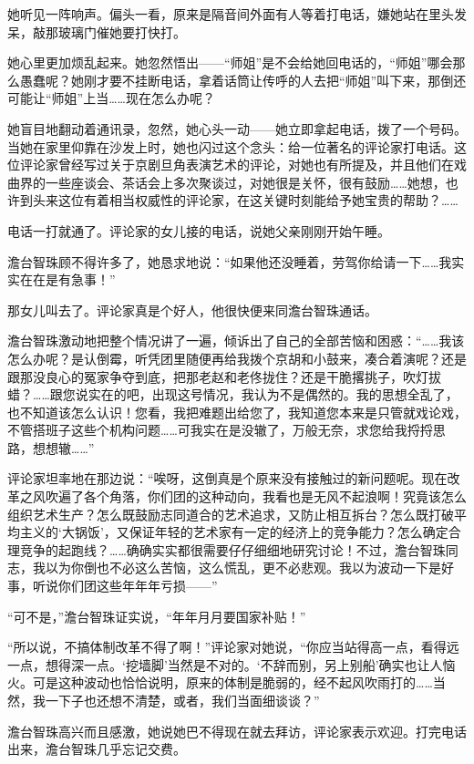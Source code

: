 \par 她听见一阵响声。偏头一看，原来是隔音间外面有人等着打电话，嫌她站在里头发呆，敲那玻璃门催她要打快打。
\par 她心里更加烦乱起来。她忽然悟出——“师姐”是不会给她回电话的，“师姐”哪会那么愚蠢呢？她刚才要不挂断电话，拿着话筒让传呼的人去把“师姐”叫下来，那倒还可能让“师姐”上当……现在怎么办呢？
\par 她盲目地翻动着通讯录，忽然，她心头一动——她立即拿起电话，拨了一个号码。当她在家里仰靠在沙发上时，她也闪过这个念头：给一位著名的评论家打电话。这位评论家曾经写过关于京剧旦角表演艺术的评论，对她也有所提及，并且他们在戏曲界的一些座谈会、茶话会上多次聚谈过，对她很是关怀，很有鼓励……她想，也许到头来这位有着相当权威性的评论家，在这关键时刻能给予她宝贵的帮助？……
\par 电话一打就通了。评论家的女儿接的电话，说她父亲刚刚开始午睡。
\par 澹台智珠顾不得许多了，她恳求地说：“如果他还没睡着，劳驾你给请一下……我实实在在是有急事！”
\par 那女儿叫去了。评论家真是个好人，他很快便来同澹台智珠通话。
\par 澹台智珠激动地把整个情况讲了一遍，倾诉出了自己的全部苦恼和困惑：“……我该怎么办呢？是认倒霉，听凭团里随便再给我拨个京胡和小鼓来，凑合着演呢？还是跟那没良心的冤家争夺到底，把那老赵和老佟拢住？还是干脆撂挑子，吹灯拔蜡？……跟您说实在的吧，出现这号情况，我认为不是偶然的。我的思想全乱了，也不知道该怎么认识！您看，我把难题出给您了，我知道您本来是只管就戏论戏，不管搭班子这些个机构问题……可我实在是没辙了，万般无奈，求您给我捋捋思路，想想辙……”
\par 评论家坦率地在那边说：“唉呀，这倒真是个原来没有接触过的新问题呢。现在改革之风吹遍了各个角落，你们团的这种动向，我看也是无风不起浪啊！究竟该怎么组织艺术生产？怎么既鼓励志同道合的艺术追求，又防止相互拆台？怎么既打破平均主义的‘大锅饭’，又保证年轻的艺术家有一定的经济上的竞争能力？怎么确定合理竞争的起跑线？……确确实实都很需要仔仔细细地研究讨论！不过，澹台智珠同志，我以为你倒也不必这么苦恼，这么慌乱，更不必悲观。我以为波动一下是好事，听说你们团这些年年年亏损——”
\par “可不是，”澹台智珠证实说，“年年月月要国家补贴！”
\par “所以说，不搞体制改革不得了啊！”评论家对她说，“你应当站得高一点，看得远一点，想得深一点。‘挖墙脚’当然是不对的。‘不辞而别，另上别船’确实也让人恼火。可是这种波动也恰恰说明，原来的体制是脆弱的，经不起风吹雨打的……当然，我一下子也还想不清楚，或者，我们当面细谈谈？”
\par 澹台智珠高兴而且感激，她说她巴不得现在就去拜访，评论家表示欢迎。打完电话出来，澹台智珠几乎忘记交费。
